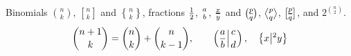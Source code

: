 \documentclass{article}
\begin{document}
Binomials ${n \choose k}$, ${n\brack k}$ and ${n\brace k}$, fractions ${1 \over 2}$, ${a \atop b}$, ${x \above 1pt y}$ and
${p \overwithdelims() q}$, ${p \atopwithdelims\langle\rangle q}$, ${p \abovewithdelims[] 0.8pt q}$, and $2^{n \choose 2}$.
\[ {n+1 \choose k} = {n \choose k} + {n \choose k-1}, \qquad \left( a \over b \middle| c \atop d \right), \quad \left\{ x \middle| ^{2} y \right\} \]
\end{document}
